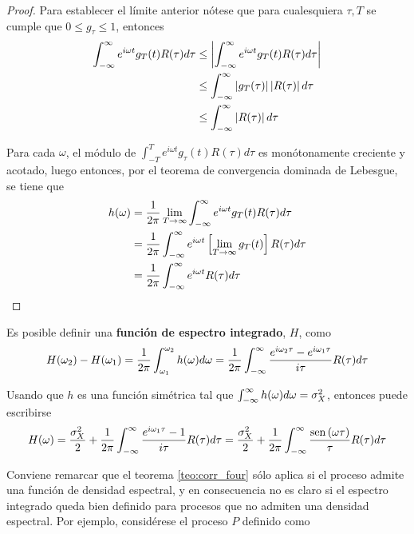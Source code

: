 \begin{proof}
Para establecer el límite anterior nótese que para cualesquiera $\tau, T$ se cumple que $0\leq g_\tau \leq 1$, entonces
\begin{align*}
\int_{-\infty}^{\infty} e^{i \omega t} g_T(t) R(\tau) d\tau
&\leq
\left| \int_{-\infty}^{\infty} e^{i \omega t} g_T(t) R(\tau) d\tau  \right| \\
&\leq
\int_{-\infty}^{\infty} \left| g_T(\tau) \right| \left|  R(\tau) \right| d\tau \\
&\leq
\int_{-\infty}^{\infty} \left|  R(\tau) \right| d\tau 
\end{align*}

Para cada $\omega$, el módulo de $\int_{-T}^{T} e^{i \omega t} g_\tau(t) R(\tau) d\tau$ es monótonamente creciente y acotado, luego entonces, por el teorema de convergencia dominada de Lebesgue, se tiene que
\begin{align*}
h(\omega) &=
\frac{1}{2\pi} \lim_{T\rightarrow \infty}
\int_{-\infty}^{\infty} e^{i \omega t} g_T(t) R(\tau) d\tau\\
&=
\frac{1}{2\pi} 
\int_{-\infty}^{\infty} e^{i \omega t} \left[ \lim_{T\rightarrow \infty} g_T(t) \right] R(\tau) d\tau\\
&=
\frac{1}{2\pi} 
\int_{-\infty}^{\infty} e^{i \omega t} R(\tau) d\tau\\
\end{align*}
\end{proof}

Es posible definir una \textbf{función de espectro integrado}, $H$, como
\begin{equation}
H(\omega_2) - H(\omega_1) = \frac{1}{2 \pi} \int_{\omega_1}^{\omega_2} h(\omega) d\omega =
\frac{1}{2\pi} \int_{-\infty}^{\infty} \frac{e^{i \omega_2 \tau}-e^{i \omega_1 \tau}}{i \tau} R(\tau) d\tau
\end{equation}

Usando que $h$ es una función simétrica tal que $\int_{-\infty}^{\infty} h(\omega) d\omega = \sigma_X^{2}$, entonces puede escribirse
\begin{equation}
H(\omega) = \frac{\sigma_X^{2}}{2} + \frac{1}{2 \pi} \int_{-\infty}^{\infty} \frac{e^{i \omega_1 \tau}-1}{i \tau} R(\tau) d\tau = \frac{\sigma_X^{2}}{2} + \frac{1}{2 \pi} \int_{-\infty}^{\infty} \frac{\mathrm{sen}\left( \omega \tau \right)}{\tau} R(\tau) d\tau
\end{equation}

Conviene remarcar que el teorema \ref{teo:corr_four} sólo aplica si el proceso admite una función de densidad espectral, y en consecuencia no es claro si el espectro integrado queda bien definido para procesos que no admiten una densidad espectral. 
%
Por ejemplo, considérese el proceso $P$ definido como 

